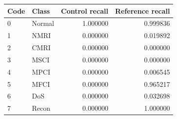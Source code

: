 \begin{tabular}{llrr}
\toprule
Code & Class & Control recall & Reference recall \\
\midrule
0 & Normal & 1.000000 & 0.999836 \\
1 & NMRI & 0.000000 & 0.019892 \\
2 & CMRI & 0.000000 & 0.000000 \\
3 & MSCI & 0.000000 & 0.000000 \\
4 & MPCI & 0.000000 & 0.006545 \\
5 & MFCI & 0.000000 & 0.965217 \\
6 & DoS & 0.000000 & 0.032698 \\
7 & Recon & 0.000000 & 1.000000 \\
\bottomrule
\end{tabular}
